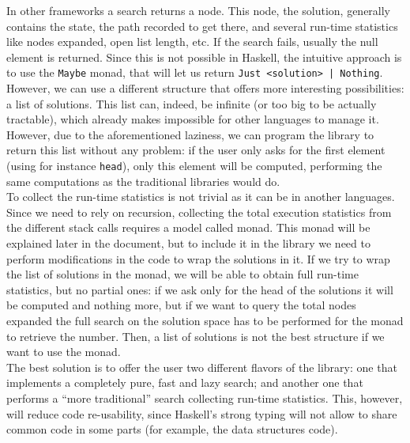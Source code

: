 In other frameworks \cite{cpp-search, cs4j, java-aima, hog2} a search returns a
node. This node, the solution, generally contains the state, the path recorded
to get there, and several run-time statistics like nodes expanded, open list
length, etc. If the search fails, usually the null element is returned. Since
this is not possible in Haskell, the intuitive approach is to use the
\texttt{Maybe} monad, that will let us return \texttt{Just <solution> |
  Nothing}. However, we can use a different structure that offers more
interesting possibilities: a list of solutions. This list can, indeed, be
infinite (or too big to be actually tractable), which already makes impossible
for other languages to manage it. However, due to the aforementioned laziness,
we can program the library to return this list without any problem: if the user
only asks for the first element (using for instance \texttt{head}), only this
element will be computed, performing the same computations as the traditional
libraries would do.\\

To collect the run-time statistics is not trivial as it can be in another
languages. Since we need to rely on recursion, collecting the total execution
statistics from the different stack calls requires a model called monad. %
This monad will be explained later in the document, but to include it in the
library we need to perform modifications in the code to wrap the solutions in
it. If we try to wrap the list of solutions in the monad, we will be able to
obtain full run-time statistics, but no partial ones: if we ask only for the
head of the solutions it will be computed and nothing more, but if we want to
query the total nodes expanded the full search on the solution space has to be
performed for the monad to retrieve the number. Then, a list of solutions is
not the best structure if we want to use the monad.\\

The best solution is to offer the user two different flavors of the library:
one that implements a completely pure, fast and lazy search; and another one
that performs a ``more traditional'' search collecting run-time statistics.
This, however, will reduce code re-usability, since Haskell's strong typing
will not allow to share common code in some parts (for example, the data
structures code).
\newpage